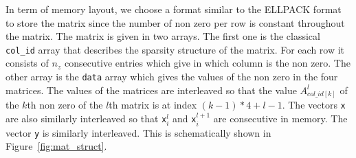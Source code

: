 \documentclass[10pt,conference,compsocconf]{IEEEtran}
\def\ttt#1{{\tt #1}}
\newcommand{\todo}[1]{{\color{red}\textbf{\hl{#1}}\xspace}}
\begin{document}
%
%
%
%
%


In term of memory layout, we choose a format similar to the ELLPACK
format to store the matrix since the number of non zero per row is
constant throughout the matrix. The matrix is given in two arrays. The
first one is the classical {\tt col\_id} array that describes the
sparsity structure of the matrix. For each row it consists of $n_z$
consecutive entries which give in which column is the non zero. The
other array is the {\tt data} array which gives the values of the non
zero in the four matrices. The values of the matrices are interleaved
so that the value $A^l_{col\_id[k]}$ of the $k$th non zero of the
$l$th matrix is at index $(k-1)*4+l-1$. The vectors {\tt x} are also
similarly interleaved so that {\tt x}$^l_i$ and {\tt x}$^{l+1}_i$ are
consecutive in memory. The vector {\tt y} is similarly
interleaved. This is schematically shown in Figure~\ref{fig:mat_struct}.
\end{document}
